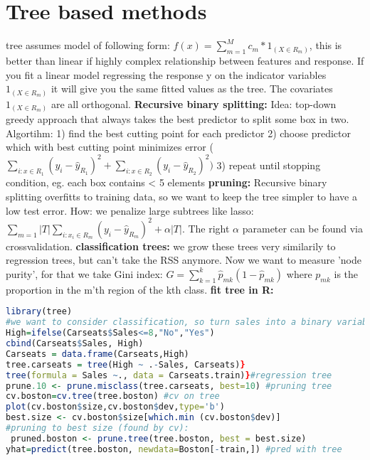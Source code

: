 \section{Tree based methods}
tree assumes model of following form: 
$f(x) = \sum_{m=1}^M c_m*1_{(X \in R_m)}$, this is better than linear if highly complex relationship between features and response. If you fit a linear model regressing the response y on the indicator variables $1_{(X \in R_m)}$ it will give you the same fitted values as the tree. The covariates $1_{(X \in R_m)}$ are all orthogonal.
\textbf{Recursive binary splitting: }
Idea: top-down greedy approach that always takes the best predictor to split some box in two. Algortihm:
1) find the best cutting point for each predictor
2) choose predictor which with best cutting point minimizes error ($\sum_{i:x \in R_1}(y_i-\hat y_{R_1})^2+\sum_{i:x \in R_2}(y_i-\hat y_{R_2})^2)$
3) repeat until stopping condition, eg. each box contains < 5 elements
\textbf{pruning: } Recursive binary splitting overfitts to training data, so we want to keep the tree simpler to have a low test error. How: we penalize large subtrees like lasso: $\sum_{m=1}{|T|}\sum_{i: x_i \in R_m}(y_i - \hat y_{R_m})^2 + \alpha|T|$. The right $\alpha$ parameter can be found via crossvalidation. 
\textbf{classification trees: } we grow these trees very similarily to regression trees, but can't take the RSS anymore. Now we want to measure 'node purity', for that we take Gini index: $G = \sum_{k=1}^k \hat p_{mk}(1-\hat p_{mk})$ where $p_{mk}$ is the proportion in the m'th region of the kth class.
\textbf{fit tree in R:}\begin{lstlisting}[language=R] library(tree)
#we want to consider classification, so turn sales into a binary variable
High=ifelse(Carseats$Sales<=8,"No","Yes")
cbind(Carseats$Sales, High)
Carseats = data.frame(Carseats,High)
tree.carseats = tree(High ~ .-Sales, Carseats)}
tree(formula = Sales ~., data = Carseats.train)}#regression tree
prune.10 <- prune.misclass(tree.carseats, best=10) #pruning tree
cv.boston=cv.tree(tree.boston) #cv on tree
plot(cv.boston$size,cv.boston$dev,type='b')
best.size <- cv.boston$size[which.min (cv.boston$dev)]
#pruning to best size (found by cv): 
 pruned.boston <- prune.tree(tree.boston, best = best.size)
yhat=predict(tree.boston, newdata=Boston[-train,]) #pred with tree \end{lstlisting}